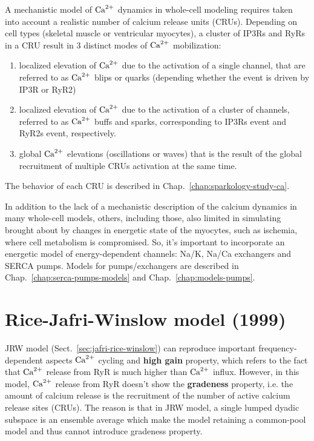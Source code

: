 A mechanistic model of ${\text{Ca}^{2+}}$ dynamics in whole-cell modeling requires
taken into account a realistic number of calcium release units
(CRUs). Depending on cell types (skeletal muscle or ventricular
myocytes), a cluster of IP3Rs and RyRs in a CRU result in 3 distinct
modes of ${\text{Ca}^{2+}}$ mobilization:
\begin{enumerate}
\item localized elevation of ${\text{Ca}^{2+}}$ due to the activation of a single
  channel, that are referred to as ${\text{Ca}^{2+}}$ blips or quarks (depending
  whether the event is driven by IP3R or RyR2)

\item localized elevation of ${\text{Ca}^{2+}}$ due to the activation of a cluster
  of channels, referred to as ${\text{Ca}^{2+}}$ buffs and sparks, corresponding to
  IP3Rs event and RyR2s event, respectively.


\item global ${\text{Ca}^{2+}}$ elevations (oscillations or waves) that is the
  result of the global recruitment of multiple CRUs activation at the
  same time. 
\end{enumerate}
The behavior of each CRU is described in
Chap.~\ref{chap:sparkology-study-ca}.

In addition to the lack of a mechanistic description of the calcium
dynamics in many whole-cell models, others, including those, also
limited in simulating brought about by changes in energetic state of
the myocytes, such as ischemia, where cell metabolism is
compromised. So, it's important to incorporate an energetic model of
energy-dependent channels: Na/K, Na/Ca exchangers and SERCA
pumps. Models for pumps/exchangers are described in
Chap.~\ref{chap:serca-pumps-models} and Chap.~\ref{chap:models-pumps}.



\section{Rice-Jafri-Winslow model (1999)}
\label{sec:rice-jafri-winslow}

JRW model (Sect.~\ref{sec:jafri-rice-winslow}) can reproduce important
frequency-dependent aspects ${\text{Ca}^{2+}}$ cycling and {\bf high gain} property, which
refers to the fact that ${\text{Ca}^{2+}}$ release from RyR is much higher than ${\text{Ca}^{2+}}$ influx.
 However, in this model, ${\text{Ca}^{2+}}$ release from RyR doesn't show the {\bf gradeness}
property, i.e. the amount of calcium release is the recruitment of the number of
active calcium release sites (CRUs). The reason is that in JRW model, a single
lumped dyadic subspace is an ensemble average which make the model retaining a
common-pool model and thus cannot introduce gradeness property.

